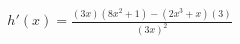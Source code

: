 \documentclass[preview]{standalone}
\begin{document}
\begin{align*}
h'(x) = \frac{(3x)(8x^2+1)-(2x^3+x)(3)}{(3x)^2}
\end{align*}
\end{document}
